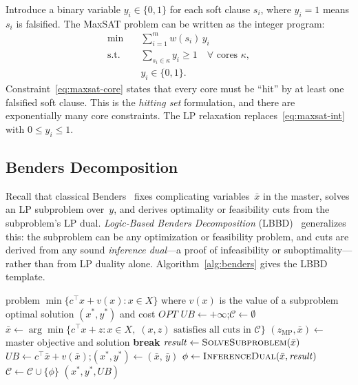 \documentclass[11pt,a4paper]{article}
\begin{document}
Introduce a binary variable $y_i \in \{0,1\}$ for each soft clause $s_i$,
where $y_i = 1$ means $s_i$ is falsified. The MaxSAT problem can be written as
the integer program:
\begin{align}
\min \quad & \sum_{i=1}^{m} w(s_i)\, y_i \label{eq:maxsat-obj}\\
\text{s.t.} \quad & \sum_{s_i \in \kappa} y_i \geq 1 \quad \forall \text{ cores } \kappa, \label{eq:maxsat-core}\\
& y_i \in \{0,1\}. \label{eq:maxsat-int}
\end{align}
Constraint~\eqref{eq:maxsat-core} states that every core must be ``hit'' by
at least one falsified soft clause. This is the \emph{hitting set}
formulation, and there are exponentially many core constraints. The LP
relaxation replaces~\eqref{eq:maxsat-int} with $0 \leq y_i \leq 1$.

\subsection{Benders Decomposition}

Recall that classical Benders~\citep{benders1962partitioning} fixes
complicating variables~$\bar{x}$ in the master, solves an LP subproblem
over~$y$, and derives optimality or feasibility cuts from the subproblem's LP
dual. \emph{Logic-Based Benders Decomposition} (LBBD)~\citep{hooker2003logic}
generalizes this: the subproblem can be any optimization or feasibility
problem, and cuts are derived from any sound \emph{inference dual}---a proof
of infeasibility or suboptimality---rather than from LP duality alone.
Algorithm~\ref{alg:benders} gives the LBBD template.

\begin{algorithm}[t]
\caption{Logic-Based Benders Decomposition (LBBD)}
\label{alg:benders}
\begin{algorithmic}[1]
\Require problem $\min\{c^{\top}x + v(x) : x \in X\}$ where $v(x)$ is the value of a subproblem
\Ensure optimal solution $(x^*, y^*)$ and cost $\mathit{OPT}$
\State $\mathit{UB} \leftarrow +\infty$;\quad $\mathcal{C} \leftarrow \emptyset$ 
\Loop
    \State $\bar{x} \leftarrow \arg\min\{c^{\top}x + z : x \in X,\; (x,z) \text{ satisfies all cuts in } \mathcal{C}\}$
    \State $(z_\mathrm{MP}, \bar{x}) \leftarrow$ master objective and solution
     \textbf{break} \EndIf {}
    \State $\mathit{result} \leftarrow \textsc{SolveSubproblem}(\bar{x})$
        \State $\mathit{UB} \leftarrow c^{\top}\bar{x} + v(\bar{x})$;\quad $(x^*, y^*) \leftarrow (\bar{x},\, \bar{y})$
    \EndIf
    \State $\phi \leftarrow \textsc{InferenceDual}(\bar{x}, \mathit{result})$
    \State $\mathcal{C} \leftarrow \mathcal{C} \cup \{\phi\}$
\EndLoop
\State \Return $(x^*, y^*, \mathit{UB})$
\end{algorithmic}
\end{algorithm}
\end{document}
